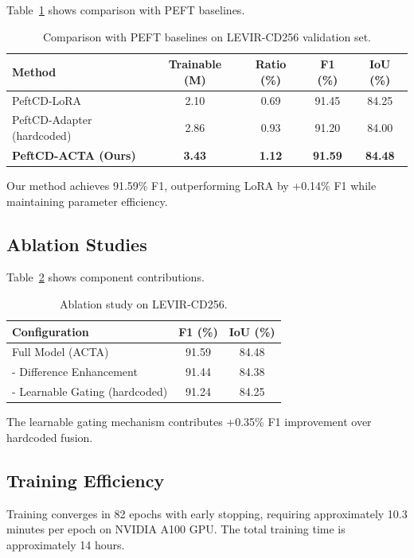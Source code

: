 \documentclass{IEEEtran}
\begin{document}
Table~\ref{tab:comparison} shows comparison with PEFT baselines.

\begin{table}[t]
\centering
\caption{Comparison with PEFT baselines on LEVIR-CD256 validation set.}
\label{tab:comparison}
\begin{tabular}{lcccc}
\toprule
Method & Trainable (M) & Ratio (\%) & F1 (\%) & IoU (\%) \\
\midrule
PeftCD-LoRA & 2.10 & 0.69 & 91.45 & 84.25 \\
PeftCD-Adapter (hardcoded) & 2.86 & 0.93 & 91.20 & 84.00 \\
\midrule
\textbf{PeftCD-ACTA (Ours)} & \textbf{3.43} & \textbf{1.12} & \textbf{91.59} & \textbf{84.48} \\
\bottomrule
\end{tabular}
\end{table}

Our method achieves 91.59\% F1, outperforming LoRA by +0.14\% F1 while maintaining parameter efficiency.

\subsection{Ablation Studies}

Table~\ref{tab:ablation} shows component contributions.

\begin{table}[t]
\centering
\caption{Ablation study on LEVIR-CD256.}
\label{tab:ablation}
\begin{tabular}{lcc}
\toprule
Configuration & F1 (\%) & IoU (\%) \\
\midrule
Full Model (ACTA) & 91.59 & 84.48 \\
- Difference Enhancement & 91.44 & 84.38 \\
- Learnable Gating (hardcoded) & 91.24 & 84.25 \\
\bottomrule
\end{tabular}
\end{table}

The learnable gating mechanism contributes +0.35\% F1 improvement over hardcoded fusion.

\subsection{Training Efficiency}

Training converges in 82 epochs with early stopping, requiring approximately 10.3 minutes per epoch on NVIDIA A100 GPU. The total training time is approximately 14 hours.
\end{document}
